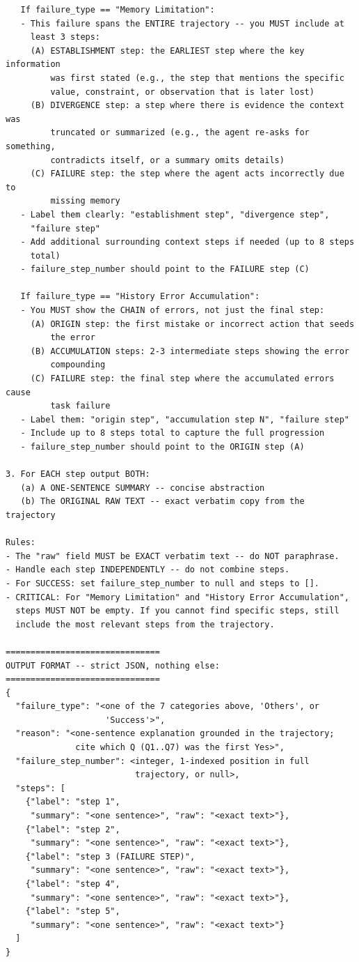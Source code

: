\documentclass[11pt]{article}
\begin{document}
\begin{tcolorbox}[
  breakable,
  colback=gray!8,
  colframe=gray!55,
  title=\textbf{Judge System Prompt (combined Stage~1 + Stage~2)},
  fonttitle=\bfseries\small,
  left=4pt,right=4pt,top=3pt,bottom=3pt,
]
\begin{verbatim}
   If failure_type == "Memory Limitation":
   - This failure spans the ENTIRE trajectory -- you MUST include at
     least 3 steps:
     (A) ESTABLISHMENT step: the EARLIEST step where the key information
         was first stated (e.g., the step that mentions the specific
         value, constraint, or observation that is later lost)
     (B) DIVERGENCE step: a step where there is evidence the context was
         truncated or summarized (e.g., the agent re-asks for something,
         contradicts itself, or a summary omits details)
     (C) FAILURE step: the step where the agent acts incorrectly due to
         missing memory
   - Label them clearly: "establishment step", "divergence step",
     "failure step"
   - Add additional surrounding context steps if needed (up to 8 steps
     total)
   - failure_step_number should point to the FAILURE step (C)

   If failure_type == "History Error Accumulation":
   - You MUST show the CHAIN of errors, not just the final step:
     (A) ORIGIN step: the first mistake or incorrect action that seeds
         the error
     (B) ACCUMULATION steps: 2-3 intermediate steps showing the error
         compounding
     (C) FAILURE step: the final step where the accumulated errors cause
         task failure
   - Label them: "origin step", "accumulation step N", "failure step"
   - Include up to 8 steps total to capture the full progression
   - failure_step_number should point to the ORIGIN step (A)

3. For EACH step output BOTH:
   (a) A ONE-SENTENCE SUMMARY -- concise abstraction
   (b) The ORIGINAL RAW TEXT -- exact verbatim copy from the trajectory

Rules:
- The "raw" field MUST be EXACT verbatim text -- do NOT paraphrase.
- Handle each step INDEPENDENTLY -- do not combine steps.
- For SUCCESS: set failure_step_number to null and steps to [].
- CRITICAL: For "Memory Limitation" and "History Error Accumulation",
  steps MUST NOT be empty. If you cannot find specific steps, still
  include the most relevant steps from the trajectory.

===============================
OUTPUT FORMAT -- strict JSON, nothing else:
===============================
{
  "failure_type": "<one of the 7 categories above, 'Others', or
                    'Success'>",
  "reason": "<one-sentence explanation grounded in the trajectory;
              cite which Q (Q1..Q7) was the first Yes>",
  "failure_step_number": <integer, 1-indexed position in full
                          trajectory, or null>,
  "steps": [
    {"label": "step 1",
     "summary": "<one sentence>", "raw": "<exact text>"},
    {"label": "step 2",
     "summary": "<one sentence>", "raw": "<exact text>"},
    {"label": "step 3 (FAILURE STEP)",
     "summary": "<one sentence>", "raw": "<exact text>"},
    {"label": "step 4",
     "summary": "<one sentence>", "raw": "<exact text>"},
    {"label": "step 5",
     "summary": "<one sentence>", "raw": "<exact text>"}
  ]
}


\end{verbatim}
\end{tcolorbox}
\end{document}
